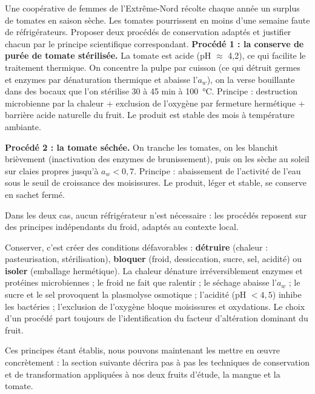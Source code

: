 \documentclass[11pt]{article}
\begin{document}
\begin{exoresolu}
Une coopérative de femmes de l'Extrême-Nord récolte chaque année un surplus de tomates en saison sèche. Les tomates pourrissent en moins d'une semaine faute de réfrigérateurs. Proposer deux procédés de conservation adaptés et justifier chacun par le principe scientifique correspondant.
\tcblower
\textbf{Procédé 1 : la conserve de purée de tomate stérilisée.} La tomate est acide (pH $\approx$ 4,2), ce qui facilite le traitement thermique. On concentre la pulpe par cuisson (ce qui détruit germes et enzymes par dénaturation thermique et abaisse l'$a_w$), on la verse bouillante dans des bocaux que l'on stérilise 30 à 45 min à \SI{100}{\celsius}. Principe : destruction microbienne par la chaleur + exclusion de l'oxygène par fermeture hermétique + barrière acide naturelle du fruit. Le produit est stable des mois à température ambiante.

\textbf{Procédé 2 : la tomate séchée.} On tranche les tomates, on les blanchit brièvement (inactivation des enzymes de brunissement), puis on les sèche au soleil sur claies propres jusqu'à $a_w < 0{,}7$. Principe : abaissement de l'activité de l'eau sous le seuil de croissance des moisissures. Le produit, léger et stable, se conserve en sachet fermé.

Dans les deux cas, aucun réfrigérateur n'est nécessaire : les procédés reposent sur des principes indépendants du froid, adaptés au contexte local.
\end{exoresolu}

\begin{aretenir}
Conserver, c'est créer des conditions défavorables : \textbf{détruire} (chaleur : pasteurisation, stérilisation), \textbf{bloquer} (froid, dessiccation, sucre, sel, acidité) ou \textbf{isoler} (emballage hermétique). La chaleur dénature irréversiblement enzymes et protéines microbiennes ; le froid ne fait que ralentir ; le séchage abaisse l'$a_w$ ; le sucre et le sel provoquent la plasmolyse osmotique ; l'acidité (pH $< 4{,}5$) inhibe les bactéries ; l'exclusion de l'oxygène bloque moisissures et oxydations. Le choix d'un procédé part toujours de l'identification du facteur d'altération dominant du fruit.
\end{aretenir}

Ces principes étant établis, nous pouvons maintenant les mettre en œuvre concrètement : la section suivante décrira pas à pas les techniques de conservation et de transformation appliquées à nos deux fruits d'étude, la mangue et la tomate.
\end{document}
